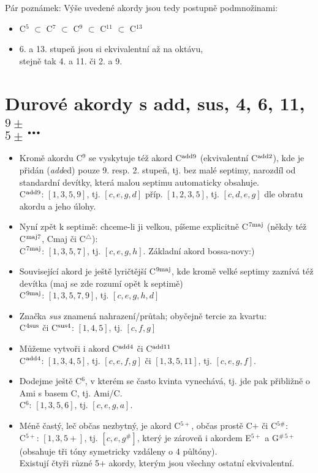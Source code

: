 \documentclass[12pt]{article}
\begin{document}
Pár poznámek: Výše uvedené akordy jsou tedy postupně podmnožinami:
\begin{itemize}
  \item C${}^{5}$ $\subset$ C${}^{7}$ $\subset$ C${}^{9}$ $\subset$ C${}^{11}$ $\subset$ C${}^{13}$ 
  \item 6. a 13. stupeň jsou si ekvivalentní až na oktávu, \\ stejně tak 4. a 11. či 2. a 9.
\end{itemize}

\section{Durové akordy s add, sus, 4, 6, 11, ${}^{9\pm}_{5\pm}$\ldots}
\begin{itemize}
  \item Kromě akordu C${}^{9}$ se vyskytuje též akord C${}^{\rm add9}$ (ekvivalentní C${}^{\rm add2}$), kde je přidán (\emph{add}ed) pouze 9. resp. 2. stupeň, tj. bez malé septimy, narozdíl od standardní devítky, která malou septimu automaticky obsahuje.
   \\ C${}^{\rm add9}$: $[1,3,5,9]$, tj. $[c,e,g,d]$ příp. $[1,2,3,5]$, tj. $[c,d,e,g]$ dle obratu akordu a jeho úlohy.
  \item Nyní zpět k septimě: chceme-li ji velkou, píšeme explicitně C${}^{\rm 7maj}$ (někdy též C${}^{\rm maj7}$, Cmaj či C${}^\triangle$): \\ C${}^{\rm 7maj}$: $[1,3,5,7]$, tj. $[c,e,g,h]$. Základní akord bossa-novy:)
  \item Související akord je ještě lyričtější C${}^{\rm 9maj}$, kde kromě velké septimy zaznívá též devítka (maj se zde rozumí opět k septimě)
   \\ C${}^{\rm 9maj}$: $[1,3,5,7,9]$, tj. $[c,e,g,h,d]$
  \item Značka \emph{sus} znamená nahrazení/průtah; obyčejně tercie za kvartu:
   \\ C${}^{\rm 4sus}$  či C${}^{\rm sus4}$: $[1,4,5]$, tj. $[c,f,g]$
  \item Můžeme vytvoři i akord C${}^{\rm add4}$ či C${}^{\rm add11}$
   \\ C${}^{\rm add4}$: $[1,3,4,5]$, tj. $[c,e,f,g]$ či $[1,3,5,11]$, tj. $[c,e,g,f]$.

  \item Dodejme ještě C${}^{6}$, v kterém se často kvinta vynechává, tj. jde pak přibližně o Ami s basem C, tj. Ami/C. 
   \\ C${}^{6}$: $[1,3,5,6]$, tj. $[c,e,g,a]$.
  \item Méně častý, leč občas nezbytný, je akord  C${}^{5+}$, občas prostě C$+$ či C${}^{5\#}$:
   \\ C${}^{5+}$: $[1,3,5+]$, tj. $[c,e,g{}^{\#}]$, který je zároveň i akordem E${}^{5+}$ a G${}^{\#\,5+}$ (obsahuje tři tóny symetricky vzdáleny o 4 půltóny).
   \\ Existují čtyři různé 5+ akordy, kterým jsou všechny ostatní ekvivalentní.


\end{itemize}
\end{document}
